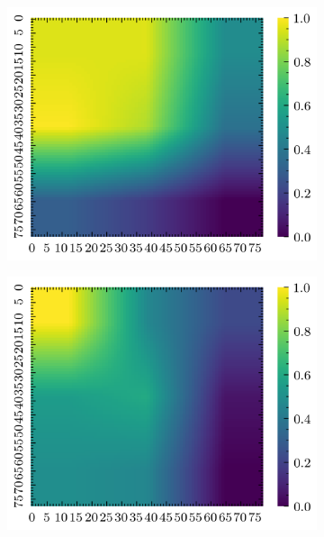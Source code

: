 \begin{figure}[H]
\begin{subfigure}[b]{0.19\textwidth}
        \includegraphics[width=\linewidth]{../img/5/quarry/worst/grad-cam-2d-2.png}
    \end{subfigure}
    \begin{subfigure}[b]{0.19\textwidth}
        \includegraphics[width=\linewidth]{../img/5/quarry/worst/grad-cam-2d-3.png}
    \end{subfigure}  
    \begin{subfigure}[b]{0.19\textwidth}

\end{subfigure}
\end{figure}
